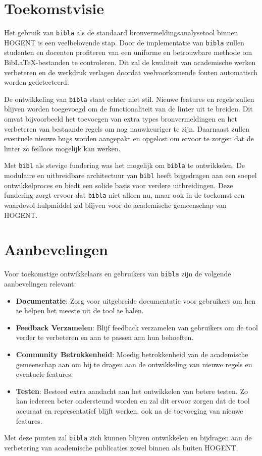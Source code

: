 \section{Toekomstvisie}
Het gebruik van \texttt{bibla} als de standaard bronvermeldingsanalysetool binnen HOGENT is een veelbelovende stap. Door de implementatie van \texttt{bibla} zullen studenten en docenten profiteren van een uniforme en betrouwbare methode om BibLaTeX-bestanden te controleren. Dit zal de kwaliteit van academische werken verbeteren en de werkdruk verlagen doordat veelvoorkomende fouten automatisch worden gedetecteerd.

De ontwikkeling van \texttt{bibla} staat echter niet stil. Nieuwe features en regels zullen blijven worden toegevoegd om de functionaliteit van de linter uit te breiden. Dit omvat bijvoorbeeld het toevoegen van extra types bronvermeldingen en het verbeteren van bestaande regels om nog nauwkeuriger te zijn. Daarnaast zullen eventuele nieuwe bugs worden aangepakt en opgelost om ervoor te zorgen dat de linter zo feilloos mogelijk kan werken.

Met \texttt{bibl} als stevige fundering was het mogelijk om \texttt{bibla} te ontwikkelen. De modulaire en uitbreidbare architectuur van \texttt{bibl} heeft bijgedragen aan een soepel ontwikkelproces en biedt een solide basis voor verdere uitbreidingen. Deze fundering zorgt ervoor dat \texttt{bibla} niet alleen nu, maar ook in de toekomst een waardevol hulpmiddel zal blijven voor de academische gemeenschap van HOGENT.

\section{Aanbevelingen}

Voor toekomstige ontwikkelaars en gebruikers van \texttt{bibla} zijn de volgende aanbevelingen relevant:
\begin{itemize}
  \item \textbf{Documentatie}: Zorg voor uitgebreide documentatie voor gebruikers om hen te helpen het meeste uit de tool te halen.
  \item \textbf{Feedback Verzamelen}: Blijf feedback verzamelen van gebruikers om de tool verder te verbeteren en aan te passen aan hun behoeften.
  \item \textbf{Community Betrokkenheid}: Moedig betrokkenheid van de academische gemeenschap aan om bij te dragen aan de ontwikkeling van nieuwe regels en eventuele features.
  \item \textbf{Testen}: Besteed extra aandacht aan het ontwikkelen van betere testen. Zo kan iedereen beter ondersteund worden en zal dit ervoor zorgen dat de tool accuraat en representatief blijft werken, ook na de toevoeging van nieuwe features.
\end{itemize}

Met deze punten zal \texttt{bibla} zich kunnen blijven ontwikkelen en bijdragen aan de verbetering van academische publicaties zowel binnen als buiten HOGENT.
